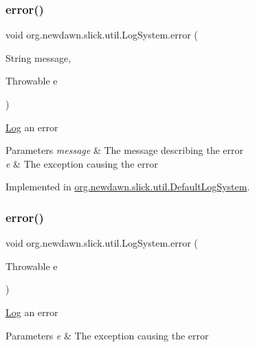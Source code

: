\subsubsection{\texorpdfstring{error()}{error()}\hspace{0.1cm}{\footnotesize\ttfamily [1/3]}}
{\footnotesize\ttfamily void org.\+newdawn.\+slick.\+util.\+Log\+System.\+error (\begin{DoxyParamCaption}\item[{String}]{message,  }\item[{Throwable}]{e }\end{DoxyParamCaption})}

\mbox{\hyperlink{classorg_1_1newdawn_1_1slick_1_1util_1_1_log}{Log}} an error


\begin{DoxyParams}{Parameters}
{\em message} & The message describing the error \\
\hline
{\em e} & The exception causing the error \\
\hline
\end{DoxyParams}


Implemented in \mbox{\hyperlink{classorg_1_1newdawn_1_1slick_1_1util_1_1_default_log_system_a4ba3a42657c5f7ee2c55fa49dbe7a287}{org.\+newdawn.\+slick.\+util.\+Default\+Log\+System}}.

\mbox{\label{interfaceorg_1_1newdawn_1_1slick_1_1util_1_1_log_system_a0aa3df31981dca33a62896d4f4dbda7b}} 
\subsubsection{\texorpdfstring{error()}{error()}\hspace{0.1cm}{\footnotesize\ttfamily [2/3]}}
{\footnotesize\ttfamily void org.\+newdawn.\+slick.\+util.\+Log\+System.\+error (\begin{DoxyParamCaption}\item[{Throwable}]{e }\end{DoxyParamCaption})}

\mbox{\hyperlink{classorg_1_1newdawn_1_1slick_1_1util_1_1_log}{Log}} an error


\begin{DoxyParams}{Parameters}
{\em e} & The exception causing the error \\
\hline
\end{DoxyParams}


